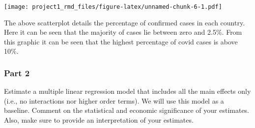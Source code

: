 \documentclass[
]{article}
\newenvironment{Shaded}{\begin{snugshade}}{\end{snugshade}}
\newcommand{\CommentTok}[1]{\textcolor[rgb]{0.56,0.35,0.01}{\textit{#1}}}
\newcommand{\DataTypeTok}[1]{\textcolor[rgb]{0.13,0.29,0.53}{#1}}
\newcommand{\KeywordTok}[1]{\textcolor[rgb]{0.13,0.29,0.53}{\textbf{#1}}}
\newcommand{\NormalTok}[1]{#1}
\newcommand{\OperatorTok}[1]{\textcolor[rgb]{0.81,0.36,0.00}{\textbf{#1}}}
\newcommand{\OtherTok}[1]{\textcolor[rgb]{0.56,0.35,0.01}{#1}}
\newcommand{\StringTok}[1]{\textcolor[rgb]{0.31,0.60,0.02}{#1}}
\begin{document}
\begin{Shaded}
\end{Shaded}

\texttt{[image: project1\_rmd\_files/figure-latex/unnamed-chunk-6-1.pdf]}

The above scatterplot details the percentage of confirmed cases in each
country. Here it can be seen that the majority of cases lie between zero
and 2.5\%. From this graphic it can be seen that the highest percentage
of covid cases is above 10\%.

\hypertarget{part-2}{%
\subsubsection{Part 2}\label{part-2}}

Estimate a multiple linear regression model that includes all the main
effects only (i.e., no interactions nor higher order terms). We will use
this model as a baseline. Comment on the statistical and economic
significance of your estimates. Also, make sure to provide an
interpretation of your estimates.
\end{document}
